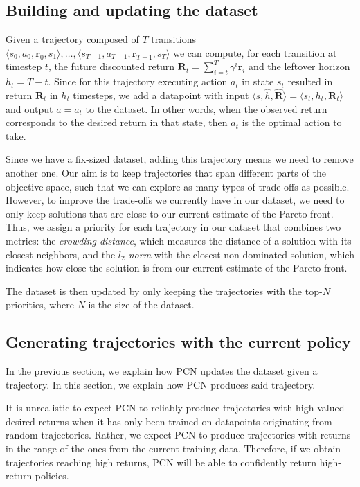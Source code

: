 \documentclass{article}
\newcommand{\ltuple}{\langle}
\newcommand{\rtuple}{\rangle}
\begin{document}
\subsection{Building and updating the dataset}
\label{sec:pcn-building-dataset}

Given a trajectory composed of $T$ transitions $\ltuple s_0, a_0, \bm{r}_0, s_1\rtuple, \dots, \ltuple s_{T-1}, a_{T-1}, \bm{r}_{T-1}, s_T\rtuple$ we can compute, for each transition at timestep $t$, the future discounted return $\bm{R}_t = \sum_{i=t}^T \gamma^i\bm{r}_i$ and the leftover horizon $h_t = T-t$. Since for this trajectory executing action $a_t$ in state $s_t$ resulted in return $\mathbf{R}_t$ in $h_t$ timesteps, we add a datapoint with input $\langle s, \hat{h}, \mathbf{\hat{R}}\rangle = \langle s_t, h_t, \mathbf{R}_t \rangle$ and output $a=a_t$ to the dataset. In other words, when the observed return corresponds to the desired return in that state, then $a_t$ is the optimal action to take.

Since we have a fix-sized dataset, adding this trajectory means we need to remove another one. Our aim is to keep trajectories that span different parts of the objective space, such that we can explore as many types of trade-offs as possible. However, to improve the trade-offs we currently have in our dataset, we need to only keep solutions that are close to our current estimate of the Pareto front. Thus, we assign a priority for each trajectory in our dataset that combines two metrics: the \emph{crowding distance}, which measures the distance of a solution with its closest neighbors, and the \emph{$l_2$-norm} with the closest non-dominated solution, which indicates how close the solution is from our current estimate of the Pareto front.

The dataset is then updated by only keeping the trajectories with the top-$N$ priorities, where $N$ is the size of the dataset.

\subsection{Generating trajectories with the current policy}
\label{sec:pcn-policy-exploration}

In the previous section, we explain how PCN updates the dataset given a trajectory. In this section, we explain how PCN produces said trajectory.

It is unrealistic to expect PCN to reliably produce trajectories with high-valued desired returns when it has only been trained on datapoints originating from random trajectories. Rather, we expect PCN to produce trajectories with returns in the range of the ones from the current training data. Therefore, if we obtain trajectories reaching high returns, PCN will be able to confidently return high-return policies.
\end{document}
